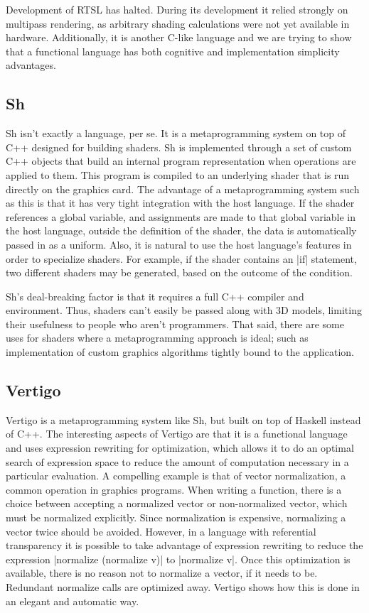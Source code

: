\documentclass[review]{acmsiggraph}      %
\begin{document}
Development of RTSL has halted.  During its development it relied strongly
on multipass rendering, as arbitrary shading calculations were not yet
available in hardware.  Additionally, it is another C-like language
and we are trying to show that a functional language has both
cognitive and implementation simplicity advantages.


\subsection{Sh}

Sh \cite{mccool02shader} isn't exactly a language, per se.  It is a
metaprogramming system on top of C++ designed for building shaders.
Sh is implemented through a set of custom C++ objects that build an
internal program representation when operations are applied to them.
This program is compiled to an underlying shader that is run directly
on the graphics card.  The advantage of a metaprogramming system such
as this is that it has very tight integration with the host
language. If the shader references a global variable, and assignments
are made to that global variable in the host language, outside the
definition of the shader, the data is automatically passed in as a
uniform.  Also, it is natural to use the host language's features in
order to specialize shaders.  For example, if the shader contains an
|if| statement, two different shaders may be generated, based on the
outcome of the condition.

Sh's deal-breaking factor is that it requires a full C++ compiler and
environment.  Thus, shaders can't easily be passed along with 3D
models, limiting their usefulness to people who aren't programmers.
That said, there are some uses for shaders where a metaprogramming
approach is ideal; such as implementation of custom graphics
algorithms tightly bound to the application.


\subsection{Vertigo}

Vertigo \cite{elliott04vertigo} is a metaprogramming system like Sh,
but built on top of Haskell instead of C++.  The interesting aspects
of Vertigo are that it is a functional language and uses expression
rewriting for optimization, which allows it to do an optimal search of
expression space to reduce the amount of computation necessary in a
particular evaluation.  A compelling example is that of vector
normalization, a common operation in graphics programs.  When writing
a function, there is a choice between accepting a normalized vector or
non-normalized vector, which must be normalized explicitly.  Since
normalization is expensive, normalizing a vector twice should be
avoided.  However, in a language with referential transparency it is
possible to take advantage of expression rewriting to reduce the
expression |normalize (normalize v)| to |normalize v|.  Once this
optimization is available, there is no reason not to normalize a
vector, if it needs to be.  Redundant normalize calls are optimized
away.  Vertigo shows how this is done in an elegant and automatic way.
\end{document}
